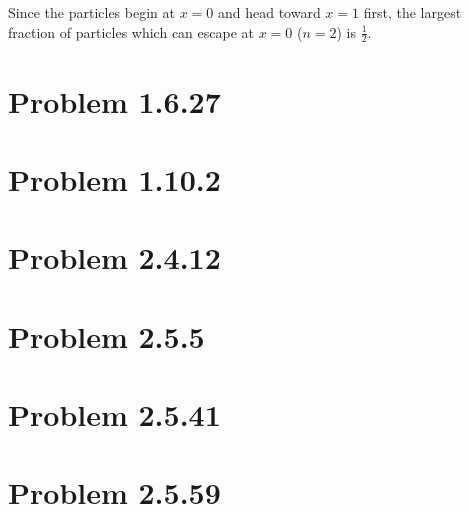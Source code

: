 \documentclass[letterpaper,10pt]{article}
\begin{document}
Since the particles begin at $x=0$ and head toward $x=1$ first, the largest fraction of particles which can escape at $x=0$ ($n=2$) is $\frac{1}{2}$.

\section*{Problem 1.6.27}

\section*{Problem 1.10.2}

\section*{Problem 2.4.12}

\section*{Problem 2.5.5}

\section*{Problem 2.5.41}

\section*{Problem 2.5.59}
\end{document}
